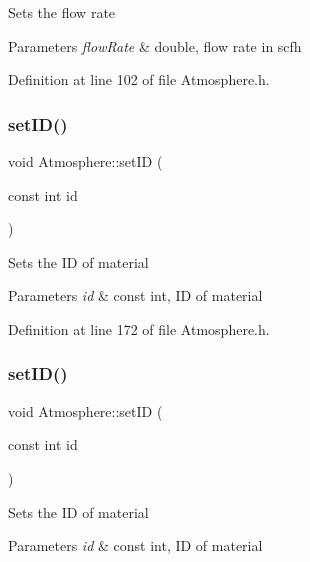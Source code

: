 Sets the flow rate 
\begin{DoxyParams}{Parameters}
{\em flow\+Rate} & double, flow rate in scfh \\
\hline
\end{DoxyParams}


Definition at line 102 of file Atmosphere.\+h.

\mbox{\label{class_atmosphere_a4698bf2580f7c24c8e0617d6455bfcac}} 
\subsubsection{\texorpdfstring{set\+I\+D()}{setID()}\hspace{0.1cm}{\footnotesize\ttfamily [1/3]}}
{\footnotesize\ttfamily void Atmosphere\+::set\+ID (\begin{DoxyParamCaption}\item[{const int}]{id }\end{DoxyParamCaption})\hspace{0.3cm}{\ttfamily [inline]}}

Sets the ID of material 
\begin{DoxyParams}{Parameters}
{\em id} & const int, ID of material \\
\hline
\end{DoxyParams}


Definition at line 172 of file Atmosphere.\+h.

\mbox{\label{class_atmosphere_a4698bf2580f7c24c8e0617d6455bfcac}} 
\subsubsection{\texorpdfstring{set\+I\+D()}{setID()}\hspace{0.1cm}{\footnotesize\ttfamily [2/3]}}
{\footnotesize\ttfamily void Atmosphere\+::set\+ID (\begin{DoxyParamCaption}\item[{const int}]{id }\end{DoxyParamCaption})\hspace{0.3cm}{\ttfamily [inline]}}

Sets the ID of material 
\begin{DoxyParams}{Parameters}
{\em id} & const int, ID of material \\
\hline
\end{DoxyParams}


